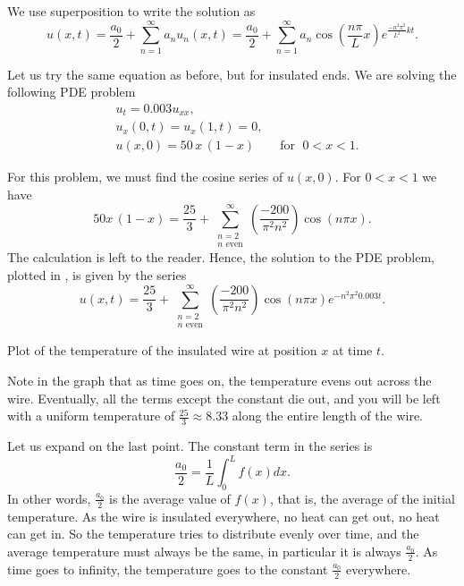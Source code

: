 \documentclass{ximera}
\begin{document}
We use superposition to write the solution as
\begin{equation*}
    u(x,t) = \frac{a_0}{2} +  \sum_{n=1}^\infty a_n u_n(x,t) = \frac{a_0}{2} + \sum_{n=1}^\infty a_n \cos \left( \frac{n \pi}{L} x \right) e^{\frac{-n^2 \pi^2}{L^2} k t} .
\end{equation*}

\begin{example}
    Let us try the same equation as before, but for insulated ends. We are solving the following PDE problem
    \begin{align*}
        & u_t = 0.003 u_{xx} , \\
        & u_x(0,t) = u_x(1,t) = 0 , \\
        & u(x,0) = 50\,x\,(1-x) \qquad \text{for } \; 0 < x < 1 .
    \end{align*}
\end{example}

\begin{exampleSol}
    For this problem, we must find the cosine series of $u(x,0)$. For $0 < x < 1$ we have
    \begin{equation*}
        50x\,(1-x) = \frac{25}{3} + \sum_{\substack{n=2 \\ n \text{ even}}}^\infty \left( \frac{-200}{\pi^2 n^2} \right) \cos (n \pi x) .
    \end{equation*}
    The calculation is left to the reader. Hence, the solution to the PDE problem, plotted in , is given by the series
    \begin{equation*}
        u(x,t) = \frac{25}{3} + \sum_{\substack{n=2 \\ n \text{ even}}}^\infty \left( \frac{-200}{\pi^2 n^2} \right) \cos ( n \pi x) e^{-n^2 \pi^2 0.003 t} .
    \end{equation*}
    
    \begin{myfig}
        \capstart
        \caption{Plot of the temperature of the insulated wire at position $x$ at time $t$.\label{heat:wireisolexfig}}
    \end{myfig}
    
    Note in the graph that as time goes on, the temperature evens out across the wire.  Eventually, all the terms except the constant die out, and you will be left with a uniform temperature of $\frac{25}{3} \approx 8.33$ along the entire length of the wire.
\end{exampleSol}

Let us expand on the last point.  The constant term in the series is
\begin{equation*}
    \frac{a_0}{2} = \frac{1}{L} \int_0^L f(x) dx .
\end{equation*}
In other words, $\frac{a_0}{2}$ is the average value of $f(x)$, that is, the average of the initial temperature.  As the wire is insulated everywhere, no heat can get out, no heat can get in.  So the temperature tries to distribute evenly over time, and the average temperature must always be the same, in particular it is always $\frac{a_0}{2}$.  As time goes to infinity, the temperature goes to the constant $\frac{a_0}{2}$ everywhere.
\end{document}
